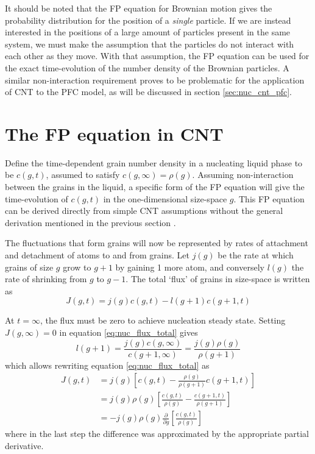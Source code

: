 It should be noted that the FP equation for Brownian motion gives the probability distribution for the position of a \textit{single} particle. If we are instead interested in the positions of a large amount of particles present in the same system, we must make the assumption that the particles do not interact with each other as they move. With that assumption, the FP equation can be used for the exact time-evolution of the number density of the Brownian particles. A similar non-interaction requirement proves to be problematic for the application of CNT to the PFC model, as will be discussed in section \ref{sec:nuc_cnt_pfc}.



\section{The FP equation in CNT}\label{sec:nuc_fopl_nucleation}

Define the time-dependent grain number density in a nucleating liquid phase to be $c(g,t)$, assumed to satisfy $c(g,\infty)=\rho(g)$. Assuming non-interaction between the grains in the liquid, a specific form of the FP equation will give the time-evolution of $c(g,t)$ in the one-dimensional size-space $g$. This FP equation can be derived directly from simple CNT assumptions without the general derivation mentioned in the previous section \cite{hoyt_phasetransf,yoo87,shi90}.

The fluctuations that form grains will now be represented by rates of attachment and detachment of atoms to and from grains. Let $j(g)$ be the rate at which grains of size $g$ grow to $g+1$ by gaining 1 more atom, and conversely $l(g)$ the rate of shrinking from $g$ to $g-1$. The total `flux' of grains in size-space is written as%
\begin{equation}\label{eq:nuc_flux_total}
J(g,t)=j(g)c(g,t)-l(g+1)c(g+1,t)
\end{equation}

At $t=\infty$, the flux must be zero to achieve nucleation steady state. Setting $J(g,\infty)=0$ in equation \ref{eq:nuc_flux_total} gives
\begin{equation}
l(g+1)= \frac{j(g)c(g,\infty)}{c(g+1,\infty)}=\frac{j(g)\rho(g)}{\rho(g+1)}
\end{equation}
which allows rewriting equation \ref{eq:nuc_flux_total} as
\begin{equation}\label{eq:nuc_flux_reduced}
\begin{split}
J(g,t)&=j(g)\left[c(g,t)-\frac{\rho(g)}{\rho(g+1)}c(g+1,t)\right]\\&=j(g)\rho(g)\left[\frac{c(g,t)}{\rho(g)}-\frac{c(g+1,t)}{\rho(g+1)}\right]\\&=-j(g)\rho(g)\frac{\partial}{\partial g}\left[\frac{c(g,t)}{\rho(g)}\right]
\end{split}
\end{equation}
where in the last step the difference was approximated by the appropriate partial derivative.

